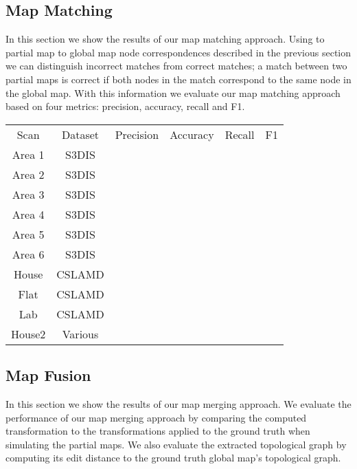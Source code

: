 \subsection{Map Matching}
In this section we show the results of our map matching approach. Using to partial map to global map node correspondences described in the previous section we can distinguish incorrect matches from correct matches; a match between two partial maps is correct if both nodes in the match correspond to the same node in the global map. With this information we evaluate our map matching approach based on four metrics: precision, accuracy, recall and F1. 

\begin{tabular}{ c c c c c c}
    Scan & Dataset & Precision & Accuracy & Recall & F1 \\ 
    Area 1 & S3DIS &  &  & & \\  
    Area 2 & S3DIS &  &  & &\\
    Area 3 & S3DIS &  &  & &\\
    Area 4 & S3DIS &  &  & &\\
    Area 5 & S3DIS &  &  & &\\
    Area 6 & S3DIS &  &  & &\\

    House & CSLAMD &  &  & &\\
    Flat & CSLAMD &  &  & &\\
    Lab & CSLAMD &  &  & &\\

    House2 & Various &  &  \\

\end{tabular}


\subsection{Map Fusion}
In this section we show the results of our map merging approach. We evaluate the performance of our map merging approach by comparing the computed transformation to the transformations applied to the ground truth when simulating the partial maps. We also evaluate the extracted topological graph by computing its edit distance to the ground truth global map's topological graph.

